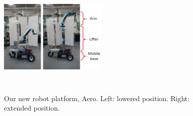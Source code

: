 \documentclass{standalone}
\begin{document}
\begin{figure}[h]
   \newcommand \ilenght{0.1}
   \newcommand \iheight{2.0in}
   \newcommand \iwidth{0.46\textwidth}
   \centering
{\includegraphics[width=\iwidth, height=\iheight]{sections/task2/images/aero.jpg}}\hspace{1.1em}%
   \caption{Our new robot platform, Aero. Left: lowered position. Right: extended position.}
   \label{fig:aero}
 \end{figure}
\end{document}
